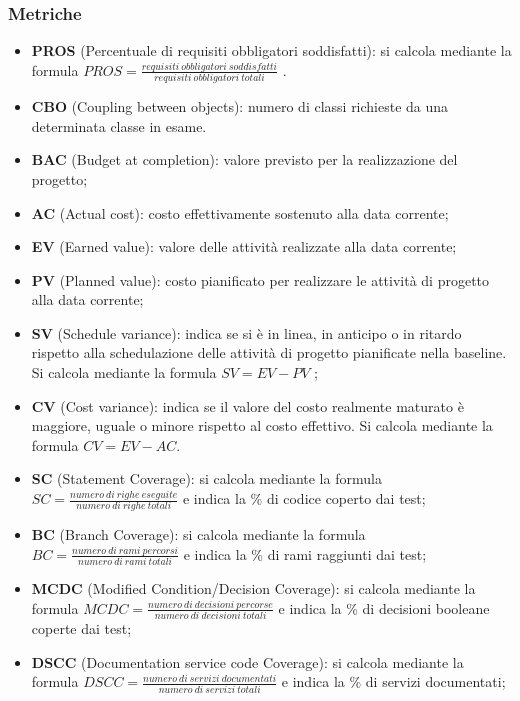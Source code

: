 \subsubsection{Metriche}
\begin{itemize}
	\item \textbf{PROS} (Percentuale di requisiti obbligatori soddisfatti): si calcola mediante la formula \newline $PROS = \frac{requisiti\ obbligatori\ soddisfatti}{requisiti\ obbligatori\ totali}$ .
\end{itemize}
\begin{itemize}
	\item \textbf{CBO} (Coupling between objects): numero di classi richieste da una determinata classe in esame.
\end{itemize}
\begin{itemize}
	\item \textbf{BAC} (Budget at completion): valore previsto per la realizzazione del progetto;
	\item \textbf{AC} (Actual cost): costo effettivamente sostenuto alla data corrente;
	\item \textbf{EV} (Earned value): valore delle attività realizzate alla data corrente;
	\item \textbf{PV} (Planned value): costo pianificato per realizzare le attività di progetto alla data corrente;
	\item \textbf{SV} (Schedule variance): indica se si è in linea, in anticipo o in ritardo rispetto alla schedulazione delle attività di progetto pianificate nella baseline. Si calcola mediante la formula $SV = EV - PV$ ;
	\item \textbf{CV} (Cost variance): indica se il valore del costo realmente maturato è maggiore, uguale o minore rispetto al costo effettivo. Si calcola mediante la formula $CV = EV - AC$.
\end{itemize}
\begin{itemize}
	\item \textbf{SC} (Statement Coverage): si calcola mediante la formula $SC = \frac{numero\ di\ righe\ eseguite}{numero\ di\ righe\ totali}$ e indica la \% di codice coperto dai test;
	\item \textbf{BC} (Branch Coverage): si calcola mediante la formula $BC = \frac{numero\ di\ rami\ percorsi}{numero\ di\ rami\ totali}$ e indica la \% di rami raggiunti dai test;
	\item \textbf{MCDC} (Modified Condition/Decision Coverage): si calcola mediante la formula \newline $MCDC = \frac{numero\ di\ decisioni\ percorse}{numero\ di\ decisioni\ totali}$ e indica la \% di decisioni booleane coperte dai test;
	\item \textbf{DSCC} (Documentation service code Coverage): si calcola mediante la formula \newline $DSCC = \frac{numero\ di\ servizi\ documentati}{numero\ di\ servizi\ totali}$ e indica la \% di servizi documentati;
\end{itemize}
